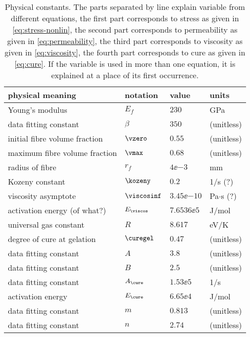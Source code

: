 \documentclass[twoside,a4paper,12pt,draft]{article}
\newcommand{\note}[1]{{\color{red}(#1)}}
\newcommand{\QM}{{\color{red}(?)}}
\newcommand{\note}[1]{}
\newcommand{\QM}{}
\begin{document}
\begin{table}[t]
  \centering
  \begin{tabular}{llll}
    \toprule
    physical meaning & notation & value & units \\
    \midrule
    Young's modulus               & $E_f$        & $230$         & GPa            \\ 
    data fitting constant         & $\beta$      & $350$         & (unitless)            \\
    initial fibre volume fraction & $\vzero$        & $0.55$        & (unitless)     \\
    maximum fibre volume fraction & $\vmax$        & $0.68$        & (unitless)     \\
    \midrule
    radius of fibre               & $r_f$        & $4\ee{-3}$    & mm             \\
    Kozeny constant              & $\kozeny$          & $0.2$         & 1/s \QM            \\
    \midrule
    viscosity asymptote     & $\viscosinf$ & $3.45\ee{-10}$ & Pa$\cdot$s \QM \\ 
    activation energy \note{of what?}    & $E_\viscos$ & $7.6536\ee{5}$& J/mol\\
    universal gas constant        & $R$          & $8.617$       & eV/K           \\
    degree of cure at  gelation   & $\curegel$   & $0.47$        & (unitless)            \\ 
    data fitting constant        &$A$ & $3.8$&(unitless)\\
    data fitting constant        &$B$ & $2.5$&(unitless)\\
    \midrule
     data fitting constant             &$A_\cure$&$1.53\ee{5}$& 1/s \\
     activation energy             &$E_\cure$& $6.65\ee{4}$  & J/mol          \\
     data fitting constant             &$m$&$0.813$& (unitless) \\
     data fitting constant             &$n$&$2.74$& (unitless) \\
    \bottomrule
  \end{tabular}
  \caption{Physical constants. The parts separated by line explain variable from different equations, the first part corresponds to stress as given in \eqref{eq:stress-nonlin}, the second part corresponds to permeability as given in \eqref{eq:permeability}, the third part corresponds to viscosity as given in \eqref{eq:viscosity}, the fourth part corresponds to cure as given in \eqref{eq:cure}. If the variable is used in more than one equation, it is explained at a place of its first occurrence.}
  \label{tab:phys-const}
\end{table}
\end{document}
